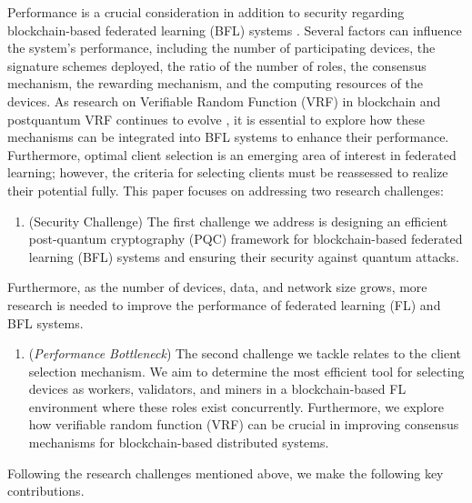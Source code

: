 Performance is a crucial consideration in addition to security regarding blockchain-based federated learning (BFL) systems \cite{pokhrelFederatedLearningBlockchain2020a}. Several factors can influence the system's performance, including the number of participating devices, the signature schemes deployed, the ratio of the number of roles, the consensus mechanism, the rewarding mechanism, and the computing resources of the devices. As research on Verifiable Random Function (VRF) in blockchain and postquantum VRF continues to evolve \cite{pqvrf}, it is essential to explore how these mechanisms can be integrated into BFL systems to enhance their performance. Furthermore, optimal client selection is an emerging area of interest in federated learning; however, the criteria for selecting clients must be reassessed to realize their potential fully.
This paper focuses on addressing two research challenges:
\begin{enumerate}
\item [${R_1}$] (Security Challenge) 
The first challenge we address is designing an efficient post-quantum cryptography (PQC) framework for blockchain-based federated learning (BFL) systems and ensuring their security against quantum attacks.

\end{enumerate}
Furthermore, as the number of devices, data, and network size grows, more research is needed to improve the performance of federated learning (FL) and BFL systems.

\begin{enumerate}
\item [${R_2}$] (\textit{Performance Bottleneck}) 
The second challenge we tackle relates to the client selection mechanism. We aim to determine the most efficient tool for selecting devices as workers, validators, and miners in a blockchain-based FL environment where these roles exist concurrently. 
Furthermore, we explore how verifiable random function (VRF) can be crucial in improving consensus mechanisms for blockchain-based distributed systems.
\end{enumerate} 

Following the research challenges mentioned above, we make the following key contributions.

